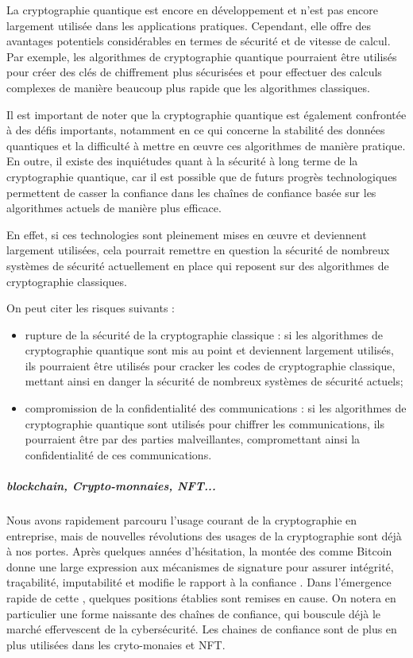La cryptographie quantique est encore en développement et n'est pas encore largement utilisée dans les applications pratiques. Cependant, elle offre des avantages potentiels considérables en termes de sécurité et de vitesse de calcul. Par exemple, les algorithmes de cryptographie quantique pourraient être utilisés pour créer des clés de chiffrement plus sécurisées et pour effectuer des calculs complexes de manière beaucoup plus rapide que les algorithmes classiques.

Il est important de noter que la cryptographie quantique est également confrontée à des défis importants, notamment en ce qui concerne la stabilité des données quantiques et la difficulté à mettre en œuvre ces algorithmes de manière pratique. En outre, il existe des inquiétudes quant à la sécurité à long terme de la cryptographie quantique, car il est possible que de futurs progrès technologiques permettent de casser la confiance dans les chaînes de confiance basée sur les algorithmes actuels de manière plus efficace.

En effet, si ces technologies sont pleinement mises en œuvre et deviennent largement utilisées, cela pourrait remettre en question la sécurité de nombreux systèmes de sécurité actuellement en place qui reposent sur des algorithmes de cryptographie classiques.

On peut citer les risques suivants : 

\begin{itemize}
  \item rupture de la sécurité de la cryptographie classique : si les algorithmes de cryptographie quantique sont mis au point et deviennent largement utilisés, ils pourraient être utilisés pour cracker les codes de cryptographie classique, mettant ainsi en danger la sécurité de nombreux systèmes de sécurité actuels;
  \item compromission de la confidentialité des communications : si les algorithmes de cryptographie quantique sont utilisés pour chiffrer les communications, ils pourraient être  par des parties malveillantes, compromettant ainsi la confidentialité de ces communications.
\end{itemize}


\subparagraph{blockchain, Crypto-monnaies, NFT...}
Nous avons rapidement parcouru l'usage courant de la cryptographie en entreprise, mais de nouvelles révolutions des usages de la cryptographie sont déjà à nos portes. Après quelques années d'hésitation, la montée des  comme Bitcoin donne une large expression aux mécanismes de signature pour assurer intégrité, traçabilité, imputabilité et modifie le rapport à la confiance . Dans l'émergence rapide de cette , quelques positions établies sont remises en cause. On notera en particulier une forme naissante  des chaînes de confiance, qui bouscule déjà le marché effervescent de la cybersécurité. Les chaines de confiance sont de plus en plus utilisées dans les cryto-monaies et NFT.

